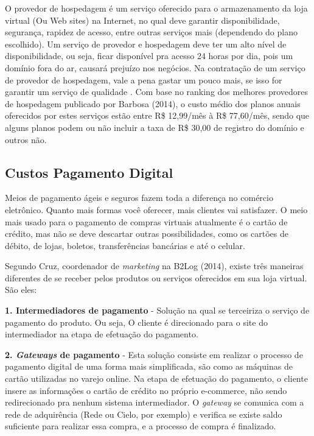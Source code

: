 O provedor de hospedagem é um serviço oferecido para o armazenamento da loja virtual (Ou Web sites) na Internet, no qual deve garantir disponibilidade, segurança, rapidez de acesso, entre outras serviços mais (dependendo do plano escolhido). Um serviço de provedor e hospedagem deve ter um alto nível de disponibilidade, ou seja, ficar disponível pra acesso 24 horas por dia, pois um domínio fora do ar, causará prejuízo nos negócios. Na contratação de um serviço de provedor de hospedagem, vale a pena gastar um pouco mais, se isso for garantir um serviço de qualidade \cite{Revistapegn2014}. Com base no ranking dos melhores provedores de hospedagem publicado por Barbosa (2014)\nocite{Barbosa2014}, o custo médio dos planos anuais oferecidos por estes serviços estão entre R\$ 12,99/mês à R\$ 77,60/mês, sendo que alguns planos podem ou não incluir a taxa de R\$ 30,00 de registro do domínio e outros não.

\subsection{Custos Pagamento Digital}

Meios de pagamento ágeis e seguros fazem toda a diferença no comércio eletrônico. Quanto mais formas você oferecer, mais clientes vai satisfazer. O meio mais usado para o pagamento de compras virtuais atualmente é o cartão de crédito, mas não se deve descartar outras possibilidades, como os cartões de débito, de lojas, boletos, transferências bancárias e até o celular. 

Segundo Cruz, coordenador de \textit{marketing} na B2Log (2014)\nocite{Cruz2014}, existe três maneiras diferentes de se receber pelos produtos ou serviços oferecidos em sua loja virtual. São eles:

\textbf{1. Intermediadores de pagamento} - Solução na qual se terceiriza o serviço de pagamento do produto. Ou seja, O cliente é direcionado para o site do intermediador na etapa de efetuação do pagamento.

\textbf{2. \textit{Gateways} de pagamento} - Esta solução consiste em realizar o processo de pagamento digital de uma forma mais simplificada, são como as máquinas de cartão utilizadas no varejo online. Na etapa de efetuação do pagamento, o cliente insere as informações o cartão de crédito no próprio e-commerce, não sendo redirecionado pra nenhum sistema intermediador. O \textit{gateway} se comunica com a rede de adquirência (Rede ou Cielo, por exemplo) e verifica se existe saldo suficiente para realizar essa compra, e a processo de compra é finalizado.

